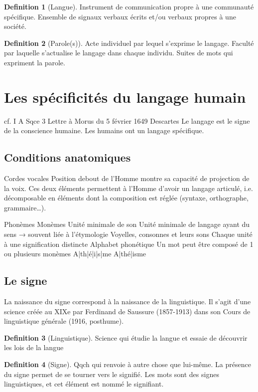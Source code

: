 \documentclass[french]{book}
\theoremstyle{definition}
\newtheorem*{dfn}{Definition}
\begin{document}
\begin{dfn}[Langue]
Instrument de communication propre à une communauté spécifique. Ensemble de signaux verbaux écrits et/ou verbaux propres à une société.
\end{dfn}

\begin{dfn}[Parole(s)]
Acte individuel par lequel s'exprime le langage. Faculté par laquelle s'actualise le langage dans chaque individu.
Suites de mots qui expriment la parole.
\end{dfn}


\section{Les spécificités du langage humain}

cf. I A Sqce 3 Lettre à Morus du 5 février 1649 Descartes
Le langage est le signe de la conscience humaine.
Les humains ont un langage spécifique.

\subsection{Conditions anatomiques}
Cordes vocales
Position debout de l'Homme montre sa capacité de projection de la voix.
Ces deux éléments permettent à l'Homme d'avoir un langage articulé, i.e. décomposable en éléments dont la composition est réglée (syntaxe, orthographe, grammaire…).

Phonèmes
Monèmes
Unité minimale de son
Unité minimale de langage ayant du sens → souvent liée à l'étymologie 
Voyelles, consonnes et leurs sons
Chaque unité à une signification distincte
Alphabet phonétique
Un mot peut être composé de 1 ou plusieurs monèmes
A|th|é|i|s|me
A|thé|isme


\subsection{Le signe}

La naissance du signe correspond à la naissance de la linguistique.
Il s'agit d'une science créée au XIXe par Ferdinand de Saussure (1857-1913) dans son Cours de linguistique générale (1916, posthume).

\begin{dfn}[Linguistique]
Science qui étudie la langue et essaie de découvrir les lois de la langue
\end{dfn}

\begin{dfn}[Signe]
Qqch qui renvoie à autre chose que lui-même. La présence du signe permet de se tourner vers le signifié. Les mots sont des signes linguistiques, et cet élément est nommé le signifiant.
\end{dfn}
\end{document}
